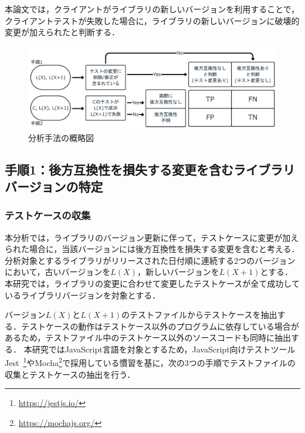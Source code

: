 \documentclass[submit]{ipsj}
\begin{document}
本論文では，クライアントがライブラリの新しいバージョンを利用することで，クライアントテストが失敗した場合に，ライブラリの新しいバージョンに破壊的変更が加えられたと判断する．

\begin{figure}[t]
  \centering
  \includegraphics[width=0.95\linewidth]{IPSJjournal_maekawa_fig/overview.pdf}
  \caption{分析手法の概略図}
  \label{fig:overview}
\end{figure}

\subsection{手順1：後方互換性を損失する変更を含むライブラリバージョンの特定}
\label{sec:step1}

\subsubsection{テストケースの収集}
\label{sec:step1-1}

本分析では，ライブラリのバージョン更新に伴って，テストケースに変更が加えられた場合に，当該バージョンには後方互換性を損失する変更を含むと考える．分析対象とするライブラリがリリースされた日付順に連続する2つのバージョンにおいて，古いバージョンを$L(X)$，新しいバージョンを$L(X+1)$とする．本研究では，ライブラリの変更に合わせて変更したテストケースが全て成功しているライブラリバージョンを対象とする．

バージョン$L(X)$と$L(X+1)$のテストファイルからテストケースを抽出する．テストケースの動作はテストケース以外のプログラムに依存している場合があるため，テストファイル中のテストケース以外のソースコードも同時に抽出する．
本研究ではJavaScript言語を対象とするため，JavaScript向けテストツールJest~\footnote{\url{https://jestjs.io/}}やMocha\footnote{\url{https://mochajs.org/}}で採用している慣習を基に，次の3つの手順でテストファイルの収集とテストケースの抽出を行う．
\end{document}
